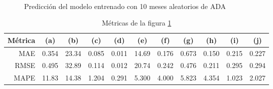 \documentclass[a4paper,10pt]{article}
\begin{document}
\begin{figure}[H]
    \\
  \caption{Predicción del modelo entrenado con 10 meses aleatorios de ADA}
  \label{f:ada_mth_prophet}
\end{figure}

\begin{table}[H]
 \begin{center}
 \resizebox{12cm}{!} {
  \begin{tabular}{|r|c|c|c|c|c|c|c|c|c|c|}
    Métrica & (a) & (b) & (c) & (d) & (e) & (f) & (g) & (h) & (i) & (j) \\ \hline
    MAE & 0.354 & 23.34 & 0.085 & 0.011 & 14.69 & 0.176 & 0.673 & 0.150 & 0.215 & 0.227 \\
    RMSE & 0.495 & 32.89 & 0.114 & 0.012 & 20.74 & 0.242 & 0.476 & 0.211 & 0.295 & 0.294 \\
    MAPE & 11.83 & 14.38 & 1.204 & 0.291 & 5.300 & 4.000 & 5.823 & 4.354 & 1.023 & 2.027 \\ \hline
  \end{tabular}
  }
  \caption{Métricas de la figura \ref{f:ada_mth_prophet}}
  \label{tab:ada_prophet_m}
 \end{center}
\end{table}
\end{document}

